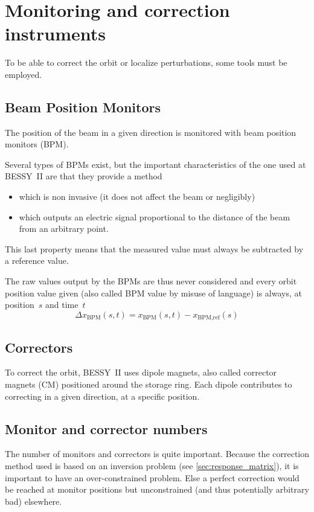 \section{Monitoring and correction instruments}
To be able to correct the orbit or localize perturbations, some tools must be employed.

\subsection{Beam Position Monitors}
The position of the beam in a given direction is monitored with beam position monitors (BPM).

Several types of BPMs exist, but the important characteristics of the one used at BESSY~II are that they provide a method
\begin{itemize}
	\item which is non invasive (it does not affect the beam or negligibly)
	\item which outputs an electric signal proportional to the distance of the beam from an arbitrary point.
\end{itemize}

This last property means that the measured value must always be subtracted by a reference value.

The raw values output by the BPMs are thus never considered and every orbit position value given (also called BPM value by misuse of language) is always, at position~$s$ and time~$t$
\begin{equation}
\Delta x_\text{BPM}(s,t) = x_\text{BPM}(s,t) - x_\text{BPM,ref}(s)
\end{equation}

\subsection{Correctors}
To correct the orbit, BESSY~II uses dipole magnets, also called corrector magnets (CM) positioned around the storage ring. Each dipole contributes to correcting in a given direction, at a specific position.

\subsection{Monitor and corrector numbers}
The number of monitors and correctors is quite important. Because the correction method used is based on an inversion problem (see \cref{sec:response_matrix}), it is important to have an over-constrained problem. Else a perfect correction would be reached at monitor positions but unconstrained (and thus potentially arbitrary bad) elsewhere.

